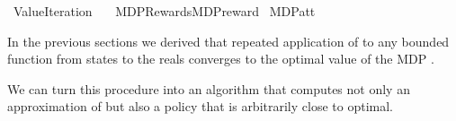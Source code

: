 %
\begin{isabellebody}%
%
%
\isadelimtheory
\isanewline
\isanewline
%
\endisadelimtheory
%
\isatagtheory
{}\isamarkupfalse%
\ Value{\isacharunderscore}{\kern0pt}Iteration\isanewline
\ \ \ {\isachardoublequoteopen}MDP{\isacharminus}{\kern0pt}Rewards{\isachardot}{\kern0pt}MDP{\isacharunderscore}{\kern0pt}reward{\isachardoublequoteclose}\isanewline
{}%
\endisatagtheory
{\isafoldtheory}%
%
\isadelimtheory
\isanewline
%
\endisadelimtheory
\isanewline
{}\isamarkupfalse%
\ MDP{\isacharunderscore}{\kern0pt}att{\isacharunderscore}{\kern0pt}{\isasymL}\isanewline
{}%
\isadelimdocument
%
\endisadelimdocument
%
\isatagdocument
%
\isamarkuptrue%
%
\endisatagdocument
{\isafolddocument}%
%
\isadelimdocument
%
\endisadelimdocument
%
\begin{isamarkuptext}%
In the previous sections we derived that repeated application of  to any bounded 
function from states to the reals converges to the optimal value of the MDP .

We can turn this procedure into an algorithm that computes not only an approximation of 
 but also a policy that is arbitrarily close to optimal.


\end{isamarkuptext}
\end{isabellebody}
